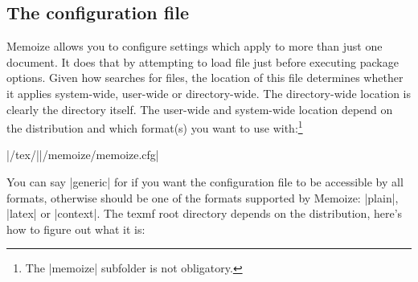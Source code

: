 \documentclass[a4paper,11pt]{article}
\begin{document}
\subsection{The configuration file}
\label{sec:memoize.cfg}

Memoize allows you to configure settings which apply to more than just one
document.  It does that by attempting to load file 
just before executing package options.  Given how  searches for
files, the location of this file determines whether it applies system-wide,
user-wide or directory-wide.  The directory-wide location is clearly the
directory itself.  The user-wide and system-wide location depend on the
 distribution and which format(s) you want to use
 with:\footnote{The |memoize| subfolder is not
  obligatory.}

\begin{center}
  |/tex/||/memoize/memoize.cfg|
\end{center}

You can say |generic| for  if you want the configuration file to
be accessible by all formats, otherwise  should be one of the
formats supported by Memoize: |plain|, |latex| or |context|.  The texmf root
directory depends on the distribution, here's how to figure out what it is:
\end{document}

